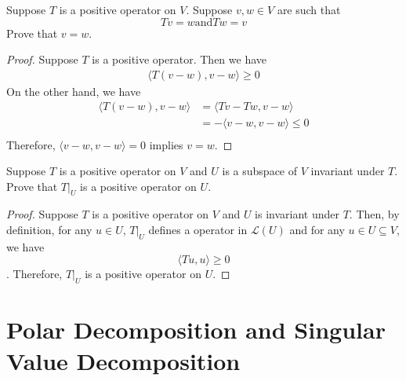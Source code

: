 \begin{exercise}
  Suppose $T$ is a positive operator on $V$. Suppose $v, w \in V$ are such that \[
    Tv = w \text{and} Tw = v \]
  Prove that $v = w$.
\end{exercise}

\begin{proof}
  Suppose $T$ is a positive operator. Then we have
  \begin{equation*}
    \begin{aligned}
      \langle T(v-w), v-w \rangle \geq 0
    \end{aligned}
  \end{equation*}
  On the other hand, we have
  \begin{equation*}
    \begin{aligned}
      \langle T(v-w), v-w \rangle &= \langle Tv - Tw, v-w \rangle \\
      &= - \langle v - w, v-w \rangle \leq 0\\
    \end{aligned}
  \end{equation*}
  Therefore, $\langle v - w, v - w \rangle = 0$ implies $v = w$.
\end{proof}

\begin{exercise}
  Suppose $T$ is a positive operator on $V$ and $U$
  is a subspace of $V$ invariant under $T$. Prove that $T|_U$
  is a positive operator on $U$.
\end{exercise}

\begin{proof}
  Suppose $T$ is a positive operator on $V$ and $U$ is invariant
  under $T$. Then, by definition, for any $u \in U$, $T|_U$ defines a 
  operator in $\mathcal{L}(U)$ and for any $u \in U \subseteq V$, we have \[
    \langle Tu, u \rangle \geq 0
  \]. Therefore, $T|_U$ is a positive operator on $U$.
\end{proof}


\section{Polar Decomposition and Singular Value Decomposition}

